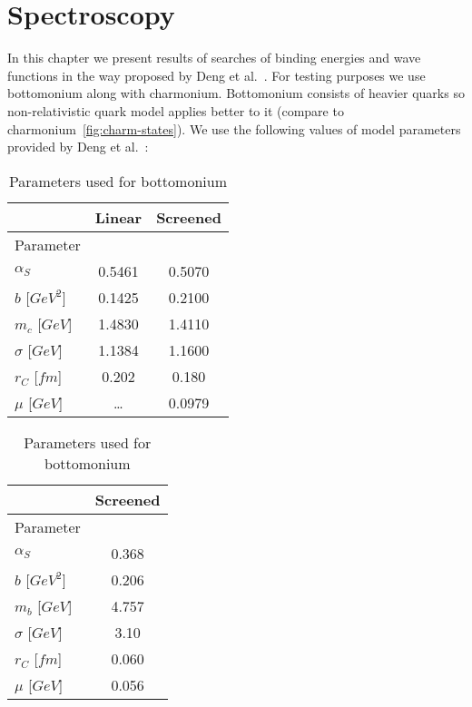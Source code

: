 \chapter{Spectroscopy}
In this chapter we present results of searches of binding energies and wave functions in the way proposed by Deng et al.~\cite{deng-bot,deng-charm}. For testing purposes we use bottomonium along with charmonium. Bottomonium consists of heavier quarks so non-relativistic quark model applies better to it (compare to charmonium~\cref{fig:charm-states}). We use the following values of model parameters provided by Deng et al.~\cite{deng-bot,deng-charm}:

\begin{table} \begin{floatrow}
\ttabbox
    {\caption{Parameters used for charmonium}}
    {\begin{tabular}{l|c|c}
        {} & Linear & Screened \\ \hline
        Parameter & {} & {} \\ \cline{1-1}
        $\alpha_S$ & 0.5461 & 0.5070 \\
        $b$ [$GeV^2$] & 0.1425 & 0.2100 \\
        $m_c$ [$GeV$] & 1.4830 & 1.4110 \\
        $\sigma$ [$GeV$] & 1.1384 & 1.1600 \\
        $r_C$ [$fm$] & 0.202 & 0.180 \\
        $\mu$ [$GeV$] & \ldots & 0.0979 \\ \hline
    \end{tabular}}
\hspace{2cm}
\ttabbox
    {\caption{Parameters used for bottomonium}}
    {\begin{tabular}{l|c}
        {} & Screened \\ \hline
        Parameter & {} \\ \cline{1-1}
        $\alpha_S$ & 0.368 \\
        $b$ [$GeV^2$] & 0.206 \\
        $m_b$ [$GeV$] & 4.757 \\
        $\sigma$ [$GeV$] & 3.10 \\
        $r_C$ [$fm$] & 0.060 \\
        $\mu$ [$GeV$] & 0.056 \\ \hline
    \end{tabular}}
\end{floatrow}
\end{table}

